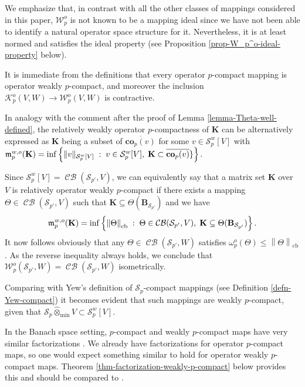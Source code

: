 \documentclass[11pt]{amsart}
\DeclareMathOperator{\cb}{cb}
\DeclareMathOperator{\CB}{\mathcal{CB}}
\newcommand{\n}[1]{ \left\|#1\right\| }
\numberwithin{equation}{section}
\begin{document}
We emphasize that, in contrast with all the other classes of mappings considered in this paper, $\mathcal{W}_p^o$ is not known to be a mapping ideal since we have not been able to identify a natural operator space structure for it. Nevertheless, it is at least normed and satisfies the ideal property (see Proposition \ref{prop-W_p^o-ideal-property} below).

It is immediate from the definitions that every operator $p$-compact mapping is operator weakly $p$-compact, and moreover the inclusion $\mathcal{K}_p^o(V,W) \to \mathcal{W}_p^o(V,W)$ is contractive. 

In analogy with the comment after the proof of Lemma \ref{lemma-Theta-well-defined}, the relatively weakly operator $p$-compactness of $\mathbf{K}$ can be alternatively expressed as $\mathbf{K}$ being a subset of $\overline{\mathbf{co}_p(v)}$ for some $v \in \mathcal{S}_p^w[V]$ with $\frak{ m}^{w,o}_p(\mathbf{K}) = \inf\left\{\| v\|_{ \mathcal{S}_p^w[V] } \;:\; v\in  \mathcal{S}_p^w[V], \; \mathbf{K}\subset \overline{\mathbf{co}_p(v)}\} \right\}.$





Since $\mathcal{S}_p^w[V] = \CB(\mathcal{S}_{p'}, V)$, we can equivalently say that a matrix set $\mathbf{K}$ over $V$  is relatively operator weakly $p$-compact if there exists a mapping $\Theta\in \CB(\mathcal{S}_{p'}, V)$ such that $\mathbf{K}\subseteq \Theta(\mathbf{B}_{\mathcal{S}_{p'}})$ and we have
\begin{equation}\label{eqn-omegap-mas-simple}
\frak{ m}^{w,o}_p(\mathbf{K}) = \inf\left\{ \n{\Theta}_{\cb} \;:\; \Theta\in\CB(\mathcal{S}_{p'},V), \; \mathbf{K}\subseteq \Theta(\mathbf{B}_{\mathcal{S}_{p'}}) \right\}.
\end{equation}
It now follows obviously that any $\Theta \in \CB(\mathcal{S}_{p'},W)$ satisfies $\omega^o_p(\Theta) \le \n{\Theta}_{\cb}$. As the reverse inequality always holds, we conclude that $\mathcal{W}_p^o(\mathcal{S}_{p'},W) = \CB(\mathcal{S}_{p'},W)$ isometrically.

Comparing with Yew's definition of $\mathcal{S}_p$-compact mappings (see Definition \ref{defn-Yew-compact}) it becomes evident that such mappings are weakly $p$-compact, given that $\mathcal{S}_p\widehat\otimes_{\min} V \subset \mathcal{S}_p^w[V]$.


In the Banach space setting, $p$-compact and weakly $p$-compact maps have very similar factorizations \cite[Thms. 3.1 and 3.2]{Sinha-Karn}.
We already have factorizations for operator $p$-compact maps, so one would expect something similar to hold for operator weakly $p$-compact maps. Theorem \ref{thm-factorization-weakly-p-compact} below provides this and should be compared to \cite[Eqn. (10)]{ChaDiGa-Operator-p-compact}.
\end{document}
